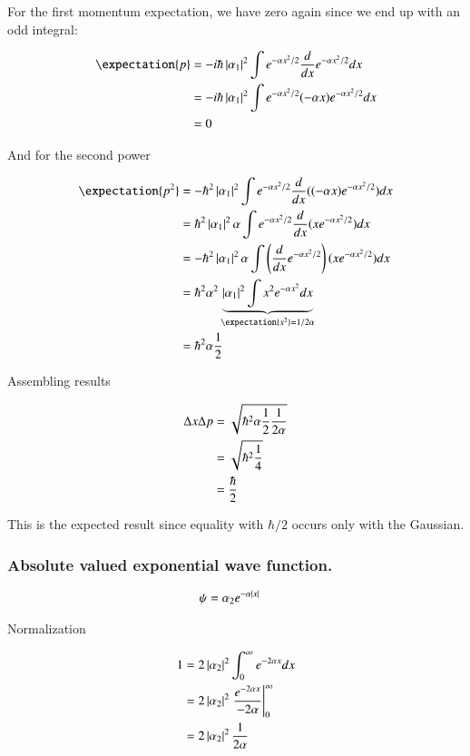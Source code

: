 \documentclass{article}
\begin{document}
For the first momentum expectation, we have zero again since we end up with an odd integral:

\begin{align*}
\expectation{p} 
&= -i \hbar \Abs{\alpha_1}^2 \int e^{-\alpha x^2 /2} \frac{d}{dx} e^{-\alpha x^2 /2} dx \\
&= -i \hbar \Abs{\alpha_1}^2 \int e^{-\alpha x^2 /2} (-\alpha x) e^{-\alpha x^2 /2} dx \\
&= 0
\end{align*}

And for the second power

\begin{align*}
\expectation{p^2} 
&= - \hbar^2 \Abs{\alpha_1}^2 \int e^{-\alpha x^2 /2} \frac{d}{dx} ((-\alpha x) e^{-\alpha x^2 /2}) dx \\
&= \hbar^2 \Abs{\alpha_1}^2 \alpha \int e^{-\alpha x^2 /2} \frac{d}{dx} (x e^{-\alpha x^2 /2}) dx \\
&= -\hbar^2 \Abs{\alpha_1}^2 \alpha \int \left(\frac{d}{dx}e^{-\alpha x^2 /2}\right) (x e^{-\alpha x^2 /2}) dx \\
&= \hbar^2 \alpha^2 \underbrace{\Abs{\alpha_1}^2 \int x^2 e^{-\alpha x^2} dx}_{\expectation{x^2} = 1/2\alpha} \\
&= \hbar^2 \alpha \inv{2}
\end{align*}

Assembling results

\begin{align*}
\Delta x \Delta p 
&= \sqrt{\hbar^2 \alpha \frac{1}{2} \frac{1}{2\alpha}} \\
&= \sqrt{\hbar^2 \frac{1}{4}} \\
&= \frac{\hbar}{2}
\end{align*}

This is the expected result since equality with $\hbar/2$ occurs only with the Gaussian.

\subsubsection{Absolute valued exponential wave function. }

\begin{align*}
\psi &= \alpha_2 e^{-\alpha\left\lvert{x}\right\rvert}
\end{align*}

Normalization

\begin{align*}
1 
&= 2 \left\lvert{\alpha_2}\right\rvert^2 \int_0^\infty e^{-2 \alpha{x}} dx \\
&= 2 \left\lvert{\alpha_2}\right\rvert^2 \left. \frac{e^{-2 \alpha{x}}}{-2\alpha} \right\vert_0^\infty \\
&= 2 \left\lvert{\alpha_2}\right\rvert^2 \frac{1}{2\alpha}
\end{align*}
\end{document}
